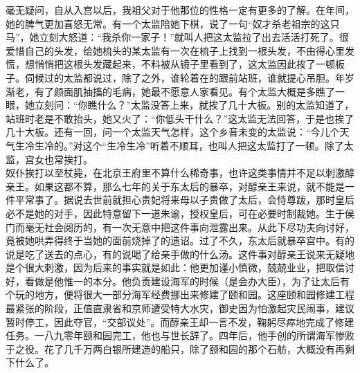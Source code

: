 毫无疑问，自从入宫以后，我祖父对于他那位的性格一定有更多的了解。在年间，她的脾气更加喜怒无常。有一个太监陪她下棋，说了一句“奴才杀老祖宗的这只马”，她立刻大怒道：“我杀你一家子！”就叫人把这太监拉了出去活活打死了。很爱惜自己的头发，给她梳头的某太监有一次在梳子上找到一根头发，不由得心里发慌，想悄悄把这根头发藏起来，不料被从镜子里看到了，这太监因此挨了一顿板子。伺候过的太监都说过，除了之外，谁轮着在的跟前站班，谁就提心吊胆。年岁渐老，有了颜面肌抽搐的毛病，她最不愿意人家看见。有个太监大概是多瞧了一眼，她立刻问：“你瞧什么？”太监没答上来，就挨了几十大板。别的太监知道了，站班时老是不敢抬头，她又火了：“你低头干什么？”这太监无法回答，于是也挨了几十大板。还有一回，问一个太监天气怎样，这个乡音未变的太监说：“今儿个天气生冷生冷的。”对这个“生冷生冷”听着不顺耳，也叫人把这太监打了一顿。除了太监，宫女也常挨打。\\

奴仆挨打以至杖毙，在北京王府里不算什么稀奇事，也许这类事情并不足以刺激醇亲王。如果这都不算，那么七年的关于东太后的暴卒，对醇亲王来说，就不能是一件平常事了。据说去世前就担心贵妃将来母以子贵做了太后，会恃尊跋，那时皇后必不是她的对手，因此特意留下一道朱谕，授权皇后，可在必要时制裁她。生于侯门而毫无社会阅历的，有一次无意中把这件事向泄露出来。从此下尽功夫向讨好，竟被她哄弄得终于当她的面前烧掉了的遗诏。过了不久，东太后就暴卒宫中。有的说是吃了送去的点心，有的说喝了给亲手做的什么汤。这件事对醇亲王说来无疑地是个很大刺激，因为后来的事实就是如此：他更加谨小慎微，兢兢业业，把取信讨好，看做是他惟一的本分。他负责建设海军的时候（是会办大臣），为了让太后有个玩的地方，便将很大一部分海军经费挪出来修建了颐和园。这座颐和园修建工程最紧张的阶段，正值直隶省和京师遭受特大水灾，御史因为怕激起灾民闹事，建议暂时停工，因此夺官，“交部议处”。而醇亲王却一言不发，鞠躬尽瘁地完成了修建任务。一八九零年颐和园完工，他也与世长辞了。四年后，他手创的所谓海军惨败于之役。花了几千万两白银所建造的船只，除了颐和园的那个石舫，大概没有再剩下什么了。
